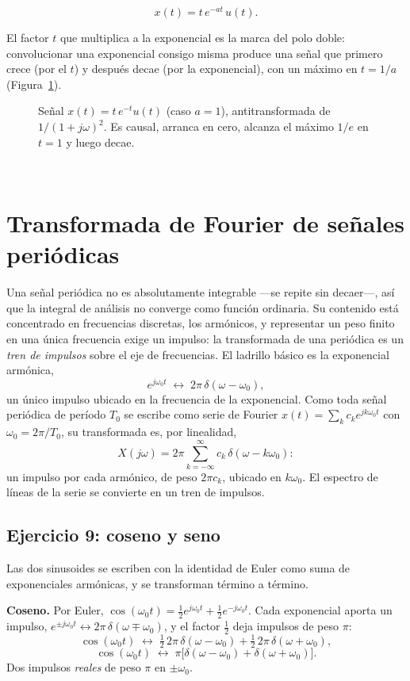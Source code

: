 \documentclass[10pt,a4paper]{article}
\newcommand{\tema}[1]{%
  \bigskip
  \noindent{\color{utnblue}\rule{\linewidth}{1pt}}\\[-0.4em]
  \section*{#1}
  \vspace{-0.6em}
}
\begin{document}
	\[
		\boxed{x(t) = t\,e^{-at}\,u(t).}
	\]

	El factor $t$ que multiplica a la exponencial es la marca del polo doble: convolucionar una exponencial consigo misma produce una señal que primero crece (por el $t$) y después decae (por la exponencial), con un máximo en $t=1/a$ (Figura~\ref{fig:sol_ej8}).

	\begin{figure}[H]
		\centering
		
		\caption{Señal $x(t)=t\,e^{-t}u(t)$ (caso $a=1$), antitransformada de $1/(1+j\omega)^2$. Es causal, arranca en cero, alcanza el máximo $1/e$ en $t=1$ y luego decae.}
		\label{fig:sol_ej8}
	\end{figure}

	\tema{Transformada de Fourier de señales periódicas}

	Una señal periódica no es absolutamente integrable ---se repite sin decaer---, así que la integral de análisis no converge como función ordinaria. Su contenido está concentrado en frecuencias discretas, los armónicos, y representar un peso finito en una única frecuencia exige un impulso: la transformada de una periódica es un \emph{tren de impulsos} sobre el eje de frecuencias. El ladrillo básico es la exponencial armónica,
	\[
		e^{j\omega_0 t} \;\leftrightarrow\; 2\pi\,\delta(\omega-\omega_0),
	\]
	un único impulso ubicado en la frecuencia de la exponencial. Como toda señal periódica de período $T_0$ se escribe como serie de Fourier $x(t)=\sum_k c_k e^{jk\omega_0 t}$ con $\omega_0=2\pi/T_0$, su transformada es, por linealidad,
	\[
		X(j\omega) = 2\pi\sum_{k=-\infty}^{\infty} c_k\,\delta(\omega-k\omega_0):
	\]
	un impulso por cada armónico, de peso $2\pi c_k$, ubicado en $k\omega_0$. El espectro de líneas de la serie se convierte en un tren de impulsos.

	\subsection*{Ejercicio 9: coseno y seno}

	Las dos sinusoides se escriben con la identidad de Euler como suma de exponenciales armónicas, y se transforman término a término.

	\textbf{Coseno.} Por Euler, $\cos(\omega_0 t)=\tfrac12 e^{j\omega_0 t}+\tfrac12 e^{-j\omega_0 t}$. Cada exponencial aporta un impulso, $e^{\pm j\omega_0 t}\leftrightarrow 2\pi\,\delta(\omega\mp\omega_0)$, y el factor $\tfrac12$ deja impulsos de peso $\pi$:
	\[
		\cos(\omega_0 t) \;\leftrightarrow\; \tfrac12\,2\pi\,\delta(\omega-\omega_0) + \tfrac12\,2\pi\,\delta(\omega+\omega_0),
	\]
	\[
		\boxed{\cos(\omega_0 t) \;\leftrightarrow\; \pi\big[\delta(\omega-\omega_0)+\delta(\omega+\omega_0)\big].}
	\]
	Dos impulsos \emph{reales} de peso $\pi$ en $\pm\omega_0$.
\end{document}
